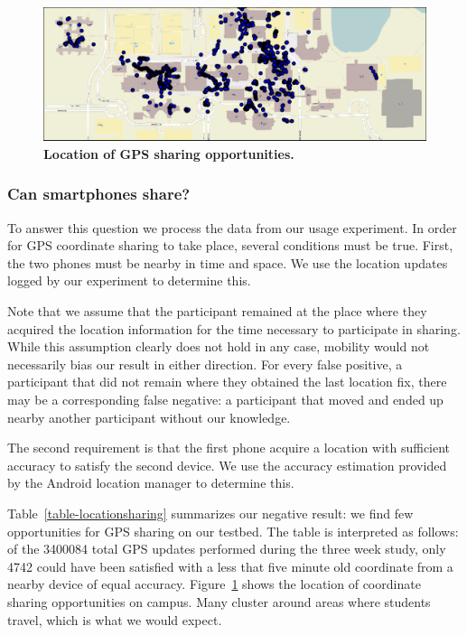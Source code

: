 \begin{figure}[t]
\includegraphics[width=\textwidth]{./figures/location/loc_sharing/map_gps_all.pdf}
\caption{\textbf{Location of GPS sharing opportunities.}}
\label{fig-locationsharing}
\end{figure}

\subsubsection{Can smartphones share?}

To answer this question we process the data from our usage experiment. In
order for GPS coordinate sharing to take place, several conditions must be
true. First, the two phones must be nearby in time and space. We use the
location updates logged by our experiment to determine this.

Note that we assume that the participant remained at the place where they
acquired the location information for the time necessary to participate in
sharing. While this assumption clearly does not hold in any case, mobility
would not necessarily bias our result in either direction. For every false
positive, a participant that did not remain where they obtained the last
location fix, there may be a corresponding false negative: a participant that
moved and ended up nearby another participant without our knowledge.

The second requirement is that the first phone acquire a location with
sufficient accuracy to satisfy the second device. We use the accuracy
estimation provided by the Android location manager to determine this.

Table~\ref{table-locationsharing} summarizes our negative result: we find few
opportunities for GPS sharing on our testbed. The table is interpreted as
follows: of the \num{3400084} total GPS updates performed during the three
week study, only \num{4742} could have been satisfied with a less that five
minute old coordinate from a nearby device of equal accuracy.
Figure~\ref{fig-locationsharing} shows the location of coordinate sharing
opportunities on campus. Many cluster around areas where students travel,
which is what we would expect.


